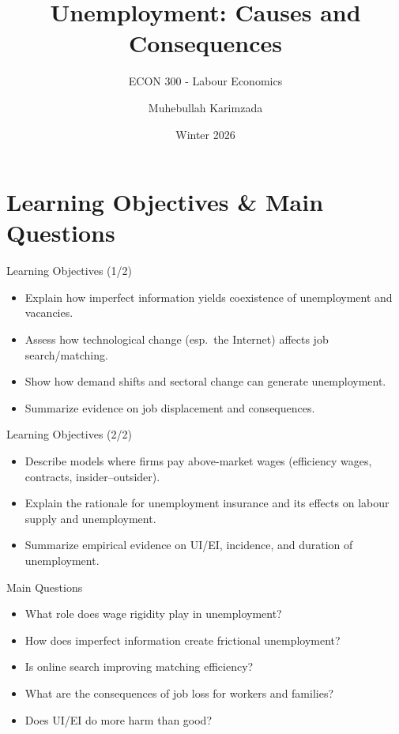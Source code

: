 \documentclass[aspectratio=169]{beamer}
\title{\textbf{Unemployment: Causes and Consequences  \vspace{.5cm}\\  }}
\subtitle{ {\large ECON 300 - Labour Economics}}
\author{Muhebullah Karimzada}
\date{Winter 2026}
\begin{document}
\begin{frame}[plain]
  \titlepage

\end{frame}

\section{Learning Objectives \& Main Questions}

\begin{frame}{Learning Objectives (1/2)}
\transfade
\begin{itemize}[<+->]
  \item Explain how imperfect information yields coexistence of unemployment and vacancies.
  \item Assess how technological change (esp.\ the Internet) affects job search/matching.
  \item Show how demand shifts and sectoral change can generate unemployment.
  \item Summarize evidence on job displacement and consequences.
\end{itemize}
\end{frame}

\begin{frame}{Learning Objectives (2/2)}
\transfade
\begin{itemize}[<+->]
  \item Describe models where firms pay above-market wages (efficiency wages, contracts, insider--outsider).
  \item Explain the rationale for unemployment insurance and its effects on labour supply and unemployment.
  \item Summarize empirical evidence on UI/EI, incidence, and duration of unemployment.
\end{itemize}
\end{frame}

\begin{frame}{Main Questions}
\transfade
\begin{itemize}[<+->]
  \item What role does \alert{wage rigidity} play in unemployment?
  \item How does \alert{imperfect information} create frictional unemployment?
  \item Is online search improving matching efficiency?
  \item What are the consequences of job loss for workers and families?
  \item Does UI/EI do more harm than good?
\end{itemize}
\end{frame}
\end{document}
